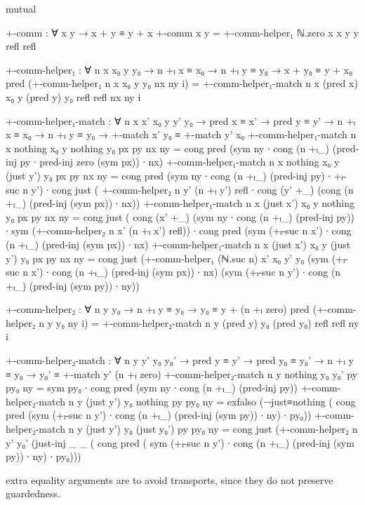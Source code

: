 \begin{code}[hide]
mutual
\end{code}
\begin{code}
  +-comm : ∀ x y → x + y ≡ y + x
  +-comm x y = +-comm-helper₁ ℕ.zero x x y y refl refl

  +-comm-helper₁ :
    ∀ n x x₀ y y₀ → n +ₗ x ≡ x₀ → n +ₗ y ≡ y₀ → x + y₀ ≡ y + x₀
  pred (+-comm-helper₁ n x x₀ y y₀ nx ny i) =
    +-comm-helper₁-match n x (pred x) x₀ y (pred y) y₀ refl refl nx ny i

  +-comm-helper₁-match :
    ∀ n x x' x₀ y y' y₀ →
    pred x ≡ x' → pred y ≡ y' → n +ₗ x ≡ x₀ → n +ₗ y ≡ y₀ →
    +-match x' y₀ ≡ +-match y' x₀
  +-comm-helper₁-match n x nothing x₀ y nothing y₀ px py nx ny =
    cong pred
      (sym ny ∙ cong (n +ₗ_) (pred-inj py ∙ pred-inj {zero} (sym px)) ∙ nx)
  +-comm-helper₁-match n x nothing x₀ y (just y') y₀ px py nx ny =
    cong pred (sym ny ∙ cong (n +ₗ_) (pred-inj py) ∙ +ₗ-suc n y') ∙
    cong just
      ( +-comm-helper₂ n y' (n +ₗ y') refl ∙
        cong (y' +_) (cong (n +ₗ_) (pred-inj (sym px)) ∙ nx))
  +-comm-helper₁-match n x (just x') x₀ y nothing y₀ px py nx ny =
    cong just
      ( cong (x' +_) (sym ny ∙ cong (n +ₗ_) (pred-inj py)) ∙
        sym (+-comm-helper₂ n x' (n +ₗ x') refl)) ∙
    cong pred (sym (+ₗ-suc n x') ∙ cong (n +ₗ_) (pred-inj (sym px)) ∙ nx)
  +-comm-helper₁-match n x (just x') x₀ y (just y') y₀ px py nx ny =
    cong just
      (+-comm-helper₁ (ℕ.suc n) x' x₀ y' y₀
        (sym (+ₗ-suc n x') ∙ cong (n +ₗ_) (pred-inj (sym px)) ∙ nx)
        (sym (+ₗ-suc n y') ∙ cong (n +ₗ_) (pred-inj (sym py)) ∙ ny))
\end{code}
\begin{code}
  +-comm-helper₂ : ∀ n y y₀ → n +ₗ y ≡ y₀ → y₀ ≡ y + (n +ₗ zero)
  pred (+-comm-helper₂ n y y₀ ny i) =
    +-comm-helper₂-match n y (pred y) y₀ (pred y₀) refl refl ny i

  +-comm-helper₂-match :
    ∀ n y y' y₀ y₀' →
    pred y ≡ y' → pred y₀ ≡ y₀' → n +ₗ y ≡ y₀ →
    y₀' ≡ +-match y' (n +ₗ zero)
  +-comm-helper₂-match n y nothing y₀ y₀' py py₀ ny =
    sym py₀ ∙ cong pred (sym ny ∙ cong (n +ₗ_) (pred-inj py))
  +-comm-helper₂-match n y (just y') y₀ nothing py py₀ ny =
    exfalso
      (¬just≡nothing
        ( cong pred
            (sym (+ₗ-suc n y') ∙ cong (n +ₗ_) (pred-inj (sym py)) ∙ ny) ∙
          py₀))
  +-comm-helper₂-match n y (just y') y₀ (just y₀') py py₀ ny =
    cong just
      (+-comm-helper₂ n y' y₀'
        (just-inj _ _
          ( cong pred
              ( sym (+ₗ-suc n y') ∙
                cong (n +ₗ_) (pred-inj (sym py)) ∙
                ny) ∙
            py₀)))
\end{code}

extra equality arguments are to avoid transports, since they do not preserve
guardedness.
